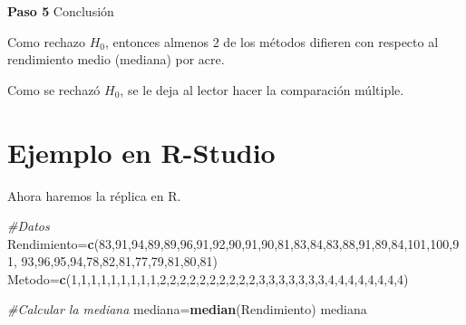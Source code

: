 \documentclass[
  a4paper,
  oneside,
  openany]{book}
\newenvironment{Shaded}{\begin{snugshade}}{\end{snugshade}}
\newcommand{\CommentTok}[1]{\textcolor[rgb]{0.56,0.35,0.01}{\textit{#1}}}
\newcommand{\DecValTok}[1]{\textcolor[rgb]{0.00,0.00,0.81}{#1}}
\newcommand{\FunctionTok}[1]{\textcolor[rgb]{0.13,0.29,0.53}{\textbf{#1}}}
\newcommand{\NormalTok}[1]{#1}
\newcommand{\OtherTok}[1]{\textcolor[rgb]{0.56,0.35,0.01}{#1}}
\begin{document}
\textbf{Paso 5} Conclusión

Como rechazo \(H_0\), entonces almenos 2 de los métodos difieren con respecto al rendimiento medio (mediana) por acre.

Como se rechazó \(H_0\), se le deja al lector hacer la comparación múltiple.

\hypertarget{ejemplo-en-r-studio-12}{%
\section{Ejemplo en R-Studio}\label{ejemplo-en-r-studio-12}}

Ahora haremos la réplica en R.

\begin{Shaded}
\begin{Highlighting}[]
\CommentTok{\#Datos}
\NormalTok{Rendimiento}\OtherTok{=}\FunctionTok{c}\NormalTok{(}\DecValTok{83}\NormalTok{,}\DecValTok{91}\NormalTok{,}\DecValTok{94}\NormalTok{,}\DecValTok{89}\NormalTok{,}\DecValTok{89}\NormalTok{,}\DecValTok{96}\NormalTok{,}\DecValTok{91}\NormalTok{,}\DecValTok{92}\NormalTok{,}\DecValTok{90}\NormalTok{,}\DecValTok{91}\NormalTok{,}\DecValTok{90}\NormalTok{,}\DecValTok{81}\NormalTok{,}\DecValTok{83}\NormalTok{,}\DecValTok{84}\NormalTok{,}\DecValTok{83}\NormalTok{,}\DecValTok{88}\NormalTok{,}\DecValTok{91}\NormalTok{,}\DecValTok{89}\NormalTok{,}\DecValTok{84}\NormalTok{,}\DecValTok{101}\NormalTok{,}\DecValTok{100}\NormalTok{,}\DecValTok{91}\NormalTok{,}
              \DecValTok{93}\NormalTok{,}\DecValTok{96}\NormalTok{,}\DecValTok{95}\NormalTok{,}\DecValTok{94}\NormalTok{,}\DecValTok{78}\NormalTok{,}\DecValTok{82}\NormalTok{,}\DecValTok{81}\NormalTok{,}\DecValTok{77}\NormalTok{,}\DecValTok{79}\NormalTok{,}\DecValTok{81}\NormalTok{,}\DecValTok{80}\NormalTok{,}\DecValTok{81}\NormalTok{)}
\NormalTok{Metodo}\OtherTok{=}\FunctionTok{c}\NormalTok{(}\DecValTok{1}\NormalTok{,}\DecValTok{1}\NormalTok{,}\DecValTok{1}\NormalTok{,}\DecValTok{1}\NormalTok{,}\DecValTok{1}\NormalTok{,}\DecValTok{1}\NormalTok{,}\DecValTok{1}\NormalTok{,}\DecValTok{1}\NormalTok{,}\DecValTok{1}\NormalTok{,}\DecValTok{2}\NormalTok{,}\DecValTok{2}\NormalTok{,}\DecValTok{2}\NormalTok{,}\DecValTok{2}\NormalTok{,}\DecValTok{2}\NormalTok{,}\DecValTok{2}\NormalTok{,}\DecValTok{2}\NormalTok{,}\DecValTok{2}\NormalTok{,}\DecValTok{2}\NormalTok{,}\DecValTok{2}\NormalTok{,}\DecValTok{3}\NormalTok{,}\DecValTok{3}\NormalTok{,}\DecValTok{3}\NormalTok{,}\DecValTok{3}\NormalTok{,}\DecValTok{3}\NormalTok{,}\DecValTok{3}\NormalTok{,}\DecValTok{3}\NormalTok{,}\DecValTok{4}\NormalTok{,}\DecValTok{4}\NormalTok{,}\DecValTok{4}\NormalTok{,}\DecValTok{4}\NormalTok{,}\DecValTok{4}\NormalTok{,}\DecValTok{4}\NormalTok{,}\DecValTok{4}\NormalTok{,}\DecValTok{4}\NormalTok{)}

\CommentTok{\#Calcular la mediana}
\NormalTok{mediana}\OtherTok{=}\FunctionTok{median}\NormalTok{(Rendimiento)}
\NormalTok{mediana}
\end{Highlighting}
\end{Shaded}
\end{document}
